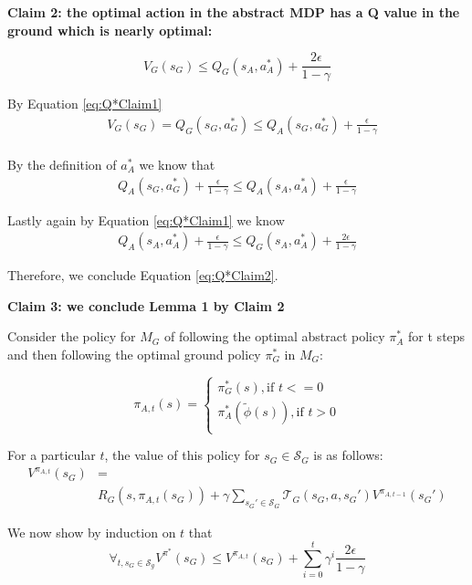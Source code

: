 \documentclass{article}
\newcommand{\ep}{\widetilde \phi}
\begin{document}
\textbf{Claim 2: the optimal action in the abstract MDP has a Q value in the ground which is nearly optimal:}

\begin{equation}
\label{eq:Q*Claim2}
V_G(s_G) \leq Q_G(s_A, a^*_A) + \frac{2\epsilon}{1-\gamma}
\end{equation}


By Equation \ref{eq:Q*Claim1}
\begin{align}
&V_G(s_G) = Q_G(s_G, a^*_G) \leq Q_A(s_G, a^*_G) + \frac{\epsilon}{1-\gamma} \\
\label{eq:Q*OptActionResult}
\end{align}

 By the definition of $a^*_A$ we know that 
 \begin{align}
Q_A(s_G, a^*_G) + \frac{\epsilon}{1-\gamma} \leq Q_A(s_A, a^*_A) + \frac{\epsilon}{1-\gamma}
\end{align}

Lastly again by Equation \ref{eq:Q*Claim1} we know
\begin{align}
Q_A(s_A, a^*_A) + \frac{\epsilon}{1-\gamma} \leq Q_G(s_A, a^*_A) + \frac{2\epsilon}{1-\gamma}
\end{align}

Therefore, we conclude Equation \ref{eq:Q*Claim2}.

\textbf{Claim 3: we conclude Lemma 1 by Claim 2}

Consider the policy for $M_G$ of following the optimal abstract policy $\pi^*_A$ for t steps and then following the optimal ground policy $\pi^*_G$ in $M_G$:

\begin{equation}
\pi_{A,t}(s)=
\begin{cases}
\pi_G^*(s), \text{if $t<=0$}\\
\pi_A^*(\ep(s)), \text{if $t > 0$}\\
\end{cases}
\end{equation}

For a particular $t$, the value of this policy for $s_G \in \mathcal{S}_G$ is as follows:
\begin{align*}
V^{\pi_{A,t}}(s_G) &= \\
&R_G(s, \pi_{A,t}(s_G)) + \gamma \sum_{{s_G}' \in \mathcal{S}_G}\mathcal{T}_G(s_G, a, {s_G}')V^{\pi_{A,t-1}}({s_G}')
\end{align*}

We now show by induction on $t$ that
\begin{equation}
\forall_{t, s_G \in \mathcal{S}_g} V^{\pi^*}(s_G) \leq  V^{\pi_{A,t}}(s_G) + \sum_{i=0}^{t}\gamma^i \frac{2\epsilon}{1-\gamma}
\end{equation}
\end{document}
